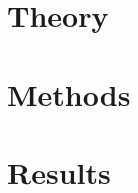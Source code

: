 \documentclass[
  10pt,
  b5paper,
  oneside
]{thesis}
\begin{document}
  
    
  \mainmatter
    

    \chapter{Theory}
      
      
      
      
 
    \chapter{Methods}
      

    \chapter{Results}
      


  \backmatter
    
    \begin{appendices}
      
    \end{appendices}
    
\end{document}
